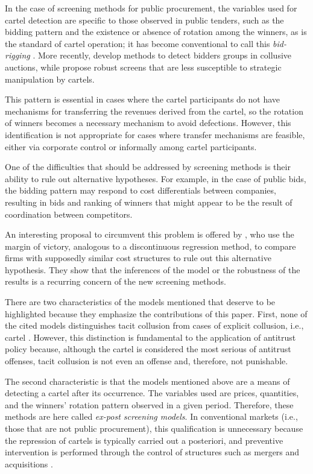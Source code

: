 In the case of screening methods for public procurement, the variables used for cartel detection are specific to those observed in public tenders, such as the bidding pattern and the existence or absence of rotation among the winners, as is the standard of cartel operation; it has become conventional to call this \textit{bid-rigging} \citep{imhof2019detecting}. More recently, \citet{conley2016detecting} develop methods to detect bidders groups in collusive auctions, while \citet{chassang2022robust} propose robust screens that are less susceptible to strategic manipulation by cartels.

This pattern is essential in cases where the cartel participants do not have mechanisms for transferring the revenues derived from the cartel, so the rotation of winners becomes a necessary mechanism to avoid defections. However, this identification is not appropriate for cases where transfer mechanisms are feasible, either via corporate control or informally among cartel participants.

One of the difficulties that should be addressed by screening methods is their ability to rule out alternative hypotheses. For example, in the case of public bids, the bidding pattern may respond to cost differentials between companies, resulting in bids and ranking of winners that might appear to be the result of coordination between competitors.

An interesting proposal to circumvent this problem is offered by \citet{kawai2019using}, who use the margin of victory, analogous to a discontinuous regression method, to compare firms with supposedly similar cost structures to rule out this alternative hypothesis. They show that the inferences of the model or the robustness of the results is a recurring concern of the new screening methods.

There are two characteristics of the models mentioned that deserve to be highlighted because they emphasize the contributions of this paper. First, none of the cited models distinguishes tacit collusion from cases of explicit collusion, i.e., cartel \citep{harrington2008detecting}. However, this distinction is fundamental to the application of antitrust policy because, although the cartel is considered the most serious of antitrust offenses, tacit collusion is not even an offense and, therefore, not punishable.

The second characteristic is that the models mentioned above are a means of detecting a cartel after its occurrence. The variables used are prices, quantities, and the winners' rotation pattern observed in a given period. Therefore, these methods are here called \textit{ex-post screening models}. In conventional markets (i.e., those that are not public procurement), this qualification is unnecessary because the repression of cartels is typically carried out a posteriori, and preventive intervention is performed through the control of structures such as mergers and acquisitions \citep{hovenkamp2005federal}.


